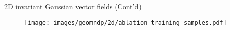 \begin{frame}{2D invariant Gaussian vector fields (Cont'd)}


    \begin{figure}
            \centering
                \texttt{[image: images/geomndp/2d/ablation\_training\_samples.pdf]}

\end{figure}
\end{frame}
